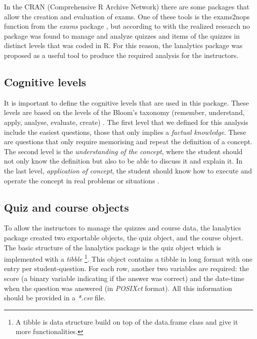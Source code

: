 In the CRAN (Comprehensive R Archive Network) there are some packages that allow the creation and evaluation of exams. One of these tools is the exams2nops function from the \textit{exams} package \cite{zeileis2012flexible}, but according to with the realized research no package was found to manage and analyze quizzes and items of the quizzes in distinct levels that was coded in R. For this reason, the lanalytics package was proposed as a useful tool to produce the required analysis for the instructors.

\subsection{Cognitive levels}

It is important to define the cognitive levels that are used in this package. These levels are based on the levels of the Bloom's taxonomy (remember, understand, apply, analyse, evaluate, create) \cite{Bloom1956}. The first level that we defined for this analysis include the easiest questions, those that only implies a \textit{factual knowledge}. These are questions that only require memorising and repeat the definition of a concept. The second level is the \textit{understanding of the concept}, where the student should not only know the definition but also to be able to discuss it and explain it. In the last level, \textit{application of concept}, the student should know how to execute and operate the concept in real problems or situations \cite{Stefan2015b}.

\subsection{Quiz and course objects}

To allow the instructors to manage the quizzes and course data, the lanalytics package created two exportable objects, the quiz object, and the course object. The basic structure of the lanalytics package is the quiz object which is implemented with a \textit{tibble} \cite{wickham2016r} \footnote{A tibble is data structure build on top of the data.frame class and give it more functionalities.}. This object contains a tibble in long format with one entry per student-question. For each row, another two variables are required: the score (a binary variable indicating if the answer was correct) and the date-time when the question was answered (in \textit{POSIXct} format). All this information should be provided in a \textit{*.csv} file. 

